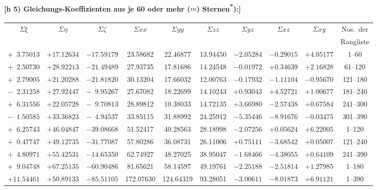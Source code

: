 \documentclass[12pt,a4paper]{article}
\theoremstyle{plain}
\theoremstyle{definition}
\theoremstyle{remark}
\begin{document}
\medskip
\paragraph*{[h 5) Gleichungs-Koeffizienten aus je 60 oder mehr ($m$) Sternen\textsuperscript{*}):]}

\begin{footnotesize}
\begin{center}
\begin{tabular}{|c|c|c||c|c|c|c|c|c||c|}
\hline
$\Sigma\xi$ & $\Sigma\eta$ & $\Sigma\zeta$ &
$\Sigma xx$ & $\Sigma yy$ & $\Sigma zz$ & $\Sigma yz$ & $\Sigma xz$ & $\Sigma xy$ &
Nos.~der \\
& & & & & & & & & Rangliste \\
\hline
$+\phantom{0}3.75013$ & $+17.12634$ & $-17.59179$ & 23.58682 & 22.46877 & 13.94450 & $-2.05284$ & $-0.29015$ & $+4.05177$ & 1--\phantom{0}60 \\
$+\phantom{0}2.50730$ & $+28.92213$ & $-21.49489$ & 27.93735 & 17.81686 & 14.24548 & $-0.01972$ & $+0.34639$ & $+2.16828$ & 61--120 \\
$+\phantom{0}2.79005$ & $+21.20288$ & $-21.81820$ & 30.13204 & 17.66032 & 12.00763 & $-0.17932$ & $-1.11104$ & $-0.95670$ & 121--180 \\
$-\phantom{0}2.31258$ & $+27.92447$ & $-\phantom{0}9.95267$ & 27.67082 & 18.22699 & 14.10243 & $+0.93043$ & $+4.52721$ & $+1.00677$ & 181--240 \\
$+\phantom{0}6.31556$ & $+22.05728$ & $-\phantom{0}9.70813$ & 28.89812 & 10.38033 & 14.72135 & $+3.66980$ & $-2.57438$ & $+0.67584$ & 241--300 \\
$-\phantom{0}1.50585$ & $+33.36823$ & $-\phantom{0}4.94537$ & 33.85115 & 31.88992 & 24.25912 & $-5.35446$ & $-8.91676$ & $-0.03475$ & 301--390 \\
\hline
$+\phantom{0}6.25743$ & $+46.04847$ & $-39.08668$ & 51.52417 & 40.28563 & 28.18998 & $-2.07256$ & $+0.05624$ & $+6.22005$ & 1--120 \\
$+\phantom{0}0.47747$ & $+49.12735$ & $-31.77087$ & 57.80286 & 36.08731 & 26.11006 & $+0.75111$ & $-3.68542$ & $+0.05007$ & 121--240 \\
$+\phantom{0}4.80971$ & $+55.42531$ & $-14.65350$ & 62.74927 & 48.27025 & 38.95047 & $-1.68466$ & $-4.38055$ & $+0.64109$ & 241--390 \\
\hline
$+\phantom{0}9.04748$ & $+67.25135$ & $-60.90486$ & 81.65621 & 58.14597 & 49.19761 & $-2.25188$ & $-2.51814$ & $+1.27985$ & 1--180 \\
$+11.54461$ & $+50.89133$ & $-85.51105$ & 172.07630 & 124.64319 & 93.28051 & $-3.00611$ & $-8.01873$ & $+6.91121$ & 1--390 \\
\hline
\end{tabular}
\end{center}
\end{footnotesize}
\end{document}
